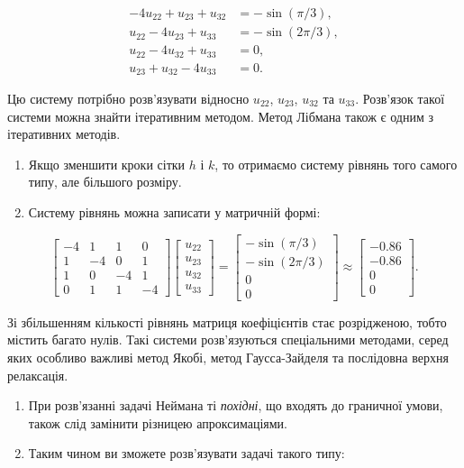 \documentclass[
  ukrainian,
]{article}
\begin{document}
\[\begin{aligned}-4u_{22} + u_{23} + u_{32} &= -\sin(\pi/3),\\u_{22} - 4u_{23} + u_{33} &= -\sin(2\pi/3),\\u_{22} - 4u_{32} + u_{33} &= 0,\\u_{23} + u_{32} - 4u_{33} &= 0.\end{aligned}\]

Цю систему потрібно розв'язувати відносно \(u_{22}\), \(u_{23}\),
\(u_{32}\) та \(u_{33}\). Розв'язок такої системи можна знайти
ітеративним методом. Метод Лібмана також є одним з ітеративних методів.

\begin{enumerate}
\def\labelenumi{\arabic{enumi}.}
\setcounter{enumi}{1}
\item
  Якщо зменшити кроки сітки \(h\) і \(k\), то отримаємо систему рівнянь
  того самого типу, але більшого розміру.
\item
  Систему рівнянь можна записати у матричній формі:
\end{enumerate}

\[\begin{bmatrix}-4 & 1 & 1 & 0 \\1 & -4 & 0 & 1 \\1 & 0 & -4 & 1 \\0 & 1 & 1 & -4\end{bmatrix}\begin{bmatrix}u_{22}\\u_{23}\\u_{32}\\u_{33}\end{bmatrix}=\begin{bmatrix}-\sin(\pi/3)\\-\sin(2\pi/3)\\0\\0\end{bmatrix}\approx\begin{bmatrix}-0.86\\-0.86\\0\\0\end{bmatrix}.\]

Зі збільшенням кількості рівнянь матриця коефіцієнтів стає розрідженою,
тобто містить багато нулів. Такі системи розв'язуються спеціальними
методами, серед яких особливо важливі метод Якобі, метод Гаусса-Зайделя
та послідовна верхня релаксація.

\begin{enumerate}
\def\labelenumi{\arabic{enumi}.}
\setcounter{enumi}{3}
\item
  При розв'язанні задачі Неймана ті \emph{похідні}, що входять до
  граничної умови, також слід замінити різницею апроксимаціями.
\item
  Таким чином ви зможете розв'язувати задачі такого типу:
\end{enumerate}
\end{document}
